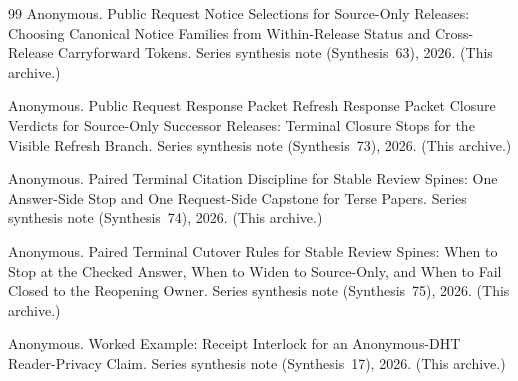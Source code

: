 \documentclass[11pt]{article}
\begin{document}
\begin{thebibliography}{99}
Anonymous.
\newblock Public Request Notice Selections for Source-Only Releases: Choosing Canonical Notice Families from Within-Release Status and Cross-Release Carryforward Tokens.
\newblock Series synthesis note (Synthesis~63), 2026. (This archive.)

Anonymous.
\newblock Public Request Response Packet Refresh Response Packet Closure Verdicts for Source-Only Successor Releases: Terminal Closure Stops for the Visible Refresh Branch.
\newblock Series synthesis note (Synthesis~73), 2026. (This archive.)

Anonymous.
\newblock Paired Terminal Citation Discipline for Stable Review Spines: One Answer-Side Stop and One Request-Side Capstone for Terse Papers.
\newblock Series synthesis note (Synthesis~74), 2026. (This archive.)

Anonymous.
\newblock Paired Terminal Cutover Rules for Stable Review Spines: When to Stop at the Checked Answer, When to Widen to Source-Only, and When to Fail Closed to the Reopening Owner.
\newblock Series synthesis note (Synthesis~75), 2026. (This archive.)

Anonymous.
\newblock Worked Example: Receipt Interlock for an Anonymous-DHT Reader-Privacy Claim.
\newblock Series synthesis note (Synthesis~17), 2026. (This archive.)

\end{thebibliography}
\end{document}
